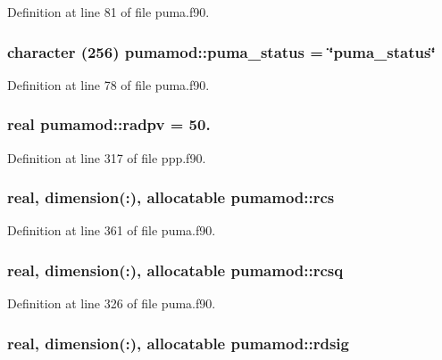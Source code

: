 \-Definition at line 81 of file puma.\-f90.

\hypertarget{classpumamod_ab188caa1d64091345227ae3bf0e83edd}{
\subsubsection[{puma\-\_\-status}]{\setlength{\rightskip}{0pt plus 5cm}character (256) {\bf pumamod\-::puma\-\_\-status} = \char`\"{}puma\-\_\-status\char`\"{}}}
\label{classpumamod_ab188caa1d64091345227ae3bf0e83edd}


\-Definition at line 78 of file puma.\-f90.

\hypertarget{classpumamod_a3d7cf5223d98e0c95a4377560f9aac6c}{
\subsubsection[{radpv}]{\setlength{\rightskip}{0pt plus 5cm}real {\bf pumamod\-::radpv} = 50.}}
\label{classpumamod_a3d7cf5223d98e0c95a4377560f9aac6c}


\-Definition at line 317 of file ppp.\-f90.

\hypertarget{classpumamod_a121f56c4792fab7bbc57da6a356ba13f}{
\subsubsection[{rcs}]{\setlength{\rightskip}{0pt plus 5cm}real, dimension(\-:), allocatable {\bf pumamod\-::rcs}}}
\label{classpumamod_a121f56c4792fab7bbc57da6a356ba13f}


\-Definition at line 361 of file puma.\-f90.

\hypertarget{classpumamod_a1102b7714ee109056cd4b64bb9ba96e4}{
\subsubsection[{rcsq}]{\setlength{\rightskip}{0pt plus 5cm}real, dimension(\-:), allocatable {\bf pumamod\-::rcsq}}}
\label{classpumamod_a1102b7714ee109056cd4b64bb9ba96e4}


\-Definition at line 326 of file puma.\-f90.

\hypertarget{classpumamod_af7f7c6447115a5e0079679528c5e20af}{
\subsubsection[{rdsig}]{\setlength{\rightskip}{0pt plus 5cm}real, dimension(\-:), allocatable {\bf pumamod\-::rdsig}}}
\label{classpumamod_af7f7c6447115a5e0079679528c5e20af}


